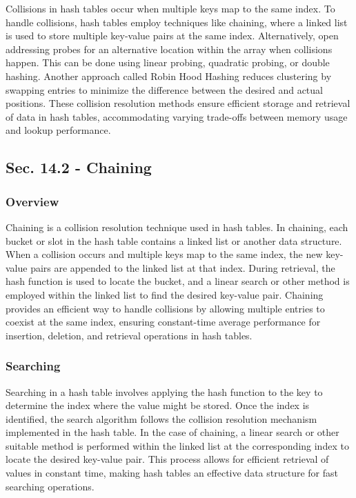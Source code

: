 Collisions in hash tables occur when multiple keys map to the same index. To handle collisions, hash tables employ techniques like chaining, where a linked list is used to store multiple key-value pairs at 
the same index. Alternatively, open addressing probes for an alternative location within the array when collisions happen. This can be done using linear probing, quadratic probing, or double hashing. Another 
approach called Robin Hood Hashing reduces clustering by swapping entries to minimize the difference between the desired and actual positions. These collision resolution methods ensure efficient storage and 
retrieval of data in hash tables, accommodating varying trade-offs between memory usage and lookup performance.

\subsection*{Sec. 14.2 - Chaining}

\subsubsection{Overview}

Chaining is a collision resolution technique used in hash tables. In chaining, each bucket or slot in the hash table contains a linked list or another data structure. When a collision occurs and multiple keys 
map to the same index, the new key-value pairs are appended to the linked list at that index. During retrieval, the hash function is used to locate the bucket, and a linear search or other method is employed 
within the linked list to find the desired key-value pair. Chaining provides an efficient way to handle collisions by allowing multiple entries to coexist at the same index, ensuring constant-time average 
performance for insertion, deletion, and retrieval operations in hash tables.

\subsubsection{Searching}

Searching in a hash table involves applying the hash function to the key to determine the index where the value might be stored. Once the index is identified, the search algorithm follows the collision resolution 
mechanism implemented in the hash table. In the case of chaining, a linear search or other suitable method is performed within the linked list at the corresponding index to locate the desired key-value pair. This 
process allows for efficient retrieval of values in constant time, making hash tables an effective data structure for fast searching operations.

